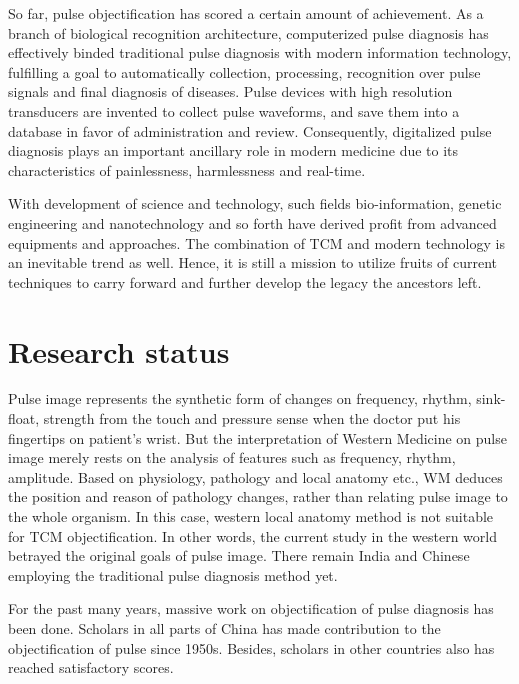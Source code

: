 So far, pulse objectification has scored a certain amount of
achievement. As a branch of biological
recognition architecture, computerized pulse diagnosis has effectively
binded traditional pulse diagnosis with modern information technology,
fulfilling a goal to automatically collection, processing, recognition
over pulse signals and final diagnosis of diseases. Pulse devices with
high resolution transducers are invented to collect pulse waveforms,
and save them into a database in favor of administration and review.
Consequently, digitalized pulse diagnosis plays an important ancillary
role in modern medicine due to its characteristics of painlessness,
harmlessness and real-time.\cite{Luo2007} 

With development of science and technology, such fields
bio-information, genetic engineering and nanotechnology and so forth
have derived profit from advanced equipments and approaches. The
combination of TCM and modern technology is an inevitable trend as
well. Hence, it is still a mission to utilize fruits of current
techniques to carry forward and further develop the legacy the
ancestors left.  

\section{Research status}
Pulse image represents the synthetic form
of changes on frequency, rhythm, sink-float, strength from the touch
and pressure sense when the doctor put his fingertips on patient’s
wrist. But the interpretation of Western Medicine on pulse image
merely rests on the analysis of features
such as frequency, rhythm, amplitude. Based on physiology, pathology
and local anatomy etc., WM deduces the position and reason of
pathology changes, rather than relating pulse image to the whole
organism. In this case, western local anatomy method is not suitable
for TCM objectification. In other words, the current study in the
western world betrayed the original goals of pulse image. There
remain India and Chinese employing the traditional pulse diagnosis
method yet. 

For the past many years, massive work on objectification of pulse
diagnosis has been done. Scholars in all parts of China has made
contribution to the objectification of pulse since 1950s.
\cite{zhang2005study,SunRen2006,CaiJun2007,ZHOUKuan-jiu2006,binghe2001fuzzy,liapplication,zhang2004feature}
Besides, scholars in other countries also has reached satisfactory
scores.\cite{yoon1987objective,michael1986instrument,yoon2000pulse,seng1977objectifying,wang1994alteration}

